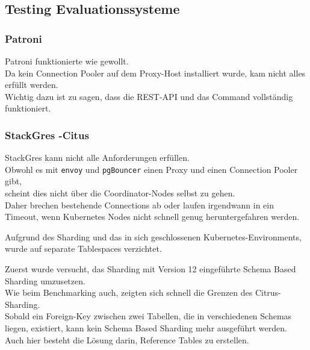
\begin{flushleft}
    \subsection{Testing Evaluationssysteme}
    \subsubsection{Patroni}
    Patroni funktionierte wie gewollt.\\
    Da kein Connection Pooler auf dem Proxy-Host installiert wurde, kam nicht alles erfüllt werden.\\
    Wichtig dazu ist zu sagen, dass die REST-API und das Command vollständig funktioniert.\\
    
\end{flushleft}
\begin{flushleft}
    \subsubsection{StackGres -Citus}
    StackGres kann nicht alle Anforderungen erfüllen.\\
    Obwohl es mit \texttt{envoy} und \texttt{pgBouncer} einen Proxy und einen Connection Pooler gibt,\\
    scheint dies nicht über die Coordinator-Nodes selbst zu gehen.\\
    Daher brechen bestehende Connections ab oder laufen irgendwann in ein Timeout, wenn \Gls{Kubernetes} Nodes nicht schnell genug heruntergefahren werden.
\end{flushleft}
\begin{flushleft}
    Aufgrund des Sharding und das in sich geschlossenen \Gls{Kubernetes}-Environments, wurde auf separate Tablespaces verzichtet.
\end{flushleft}
\begin{flushleft}
    Zuerst wurde versucht, das Sharding mit Version 12 eingeführte Schema Based Sharding umzusetzen.\\
    Wie beim Benchmarking auch, zeigten sich schnell die Grenzen des Citrus-Sharding.\\
    Sobald ein Foreign-Key zwischen zwei Tabellen, die in verschiedenen Schemas liegen, existiert, kann kein Schema Based Sharding mehr ausgeführt werden.\\
    Auch hier besteht die Lösung darin, Reference Tables zu erstellen.
\end{flushleft}
